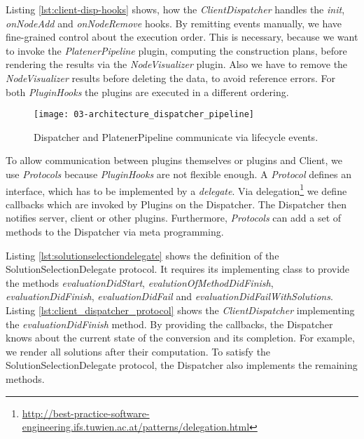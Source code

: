 \documentclass[../ClassicThesis.tex]{subfiles}
\begin{document}
Listing \ref{lst:client-disp-hooks} shows, how the \emph{ClientDispatcher}
 handles the \textit{init},
\textit{onNodeAdd} and \textit{onNodeRemove} hooks. By remitting events manually, we have fine-grained
control about the execution order. This is necessary, because we want to invoke
the \emph{PlatenerPipeline} plugin, computing the construction plans, before
rendering the results via the \emph{NodeVisualizer} plugin. Also we have to
remove the \emph{NodeVisualizer} results before deleting the data, to avoid
reference errors. For both \emph{PluginHooks} the plugins are executed in a
different ordering.


\begin{figure}
\centering
\texttt{[image: 03-architecture\_dispatcher\_pipeline]}
\caption{Dispatcher and PlatenerPipeline communicate via lifecycle events.}
\label{fig:architecture_dispatcher_pipeline}
\end{figure}

To allow communication between plugins themselves or plugins and Client, we use
\emph{Protocols} because \emph{PluginHooks} are not flexible enough. A
\emph{Protocol} defines an interface, which has to be implemented by a
\textit{delegate}. Via
delegation\footnote{\url{http://best-practice-software-engineering.ifs.tuwien.ac.at/patterns/delegation.html}}
we define callbacks which are invoked by Plugins on the Dispatcher. The
Dispatcher then notifies server, client or other plugins. Furthermore,
\emph{Protocols} can add a set of methods to the Dispatcher via meta
programming.

Listing \ref{lst:solutionselectiondelegate} shows the definition of the
SolutionSelectionDelegate protocol. It requires its implementing class to
provide the methods \textit{evaluationDidStart},
\textit{evalutionOfMethodDidFinish}, \textit{evaluationDidFinish},
\textit{evaluationDidFail} and \textit{evaluationDidFailWithSolutions}. Listing
\ref{lst:client_dispatcher_protocol} shows the \emph{ClientDispatcher} implementing the
\textit{evaluationDidFinish} method. By providing the callbacks, the Dispatcher
knows about the current state of the conversion and its completion. For example,
we render all solutions after their computation. To satisfy the
SolutionSelectionDelegate protocol, the Dispatcher also implements the remaining
methods.
\end{document}
